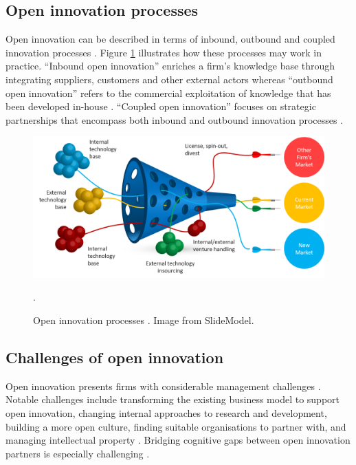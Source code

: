 \subsection{Open innovation processes}

Open innovation can be described in terms of inbound, outbound and coupled innovation processes \citep{chesbrough2006beyond,enkel2009open,gassmann2010future}. Figure \ref{fig:oi_process} illustrates how these processes may work in practice. \enquote{Inbound open innovation} enriches a firm’s knowledge base through integrating suppliers, customers and other external actors \citep{xu2013inbound} whereas \enquote{outbound open innovation} refers to the commercial exploitation of knowledge that has been developed in-house \citep{de2016knowledge}. \enquote{Coupled open innovation} focuses on strategic partnerships that encompass both inbound and outbound innovation processes \citep{spithoven2013open}. \medskip

\begin{figure}
	\centering
	\includegraphics[width=0.9\linewidth]{Images/oi_process_2}
	\caption{Open innovation processes \citep{chesbrough2004open}. Image from SlideModel.}.
	\label{fig:oi_process}
\end{figure}

\subsection{Challenges of open innovation}

Open innovation presents firms with considerable management challenges \citep{hossain2013open,vanhaverbeke2014surfing}. Notable challenges include transforming the existing business model to support open innovation, changing internal approaches to research and development, building a more open culture, finding suitable organisations to partner with, and managing intellectual property \citep{dahlander2010open,sieg2010managerial,lichtenthaler2011your,durst2013success,roper2013externalities,aloini2016structured}. Bridging cognitive gaps between open innovation partners is especially challenging \citep{vanhaverbeke2007connecting,lakemond2016match}. \medskip

